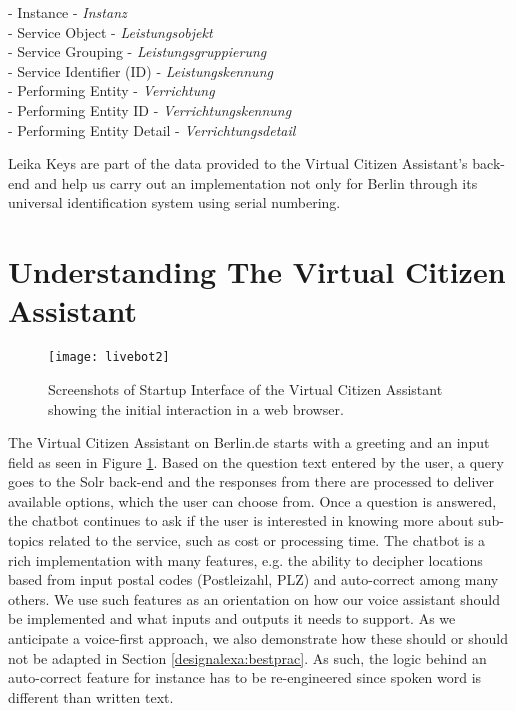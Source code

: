 \begin{flushleft}
- Instance \quad \quad \quad \quad \quad \quad \space \space  - \textit{Instanz}\\
- Service Object \quad \quad \quad  \space \space \space \space - \textit{Leistungsobjekt}\\
- Service Grouping \quad \quad \space \space \space - \textit{Leistungsgruppierung}\\
- Service Identifier (ID)   \space \space \space \space- \textit{Leistungskennung}\\
- Performing Entity \quad \quad \space \space - \textit{Verrichtung}\\
- Performing Entity ID \quad \space - \textit{Verrichtungskennung}\\
- Performing Entity Detail  - \textit{Verrichtungsdetail}\\
\end{flushleft}

Leika Keys are part of the data provided to the Virtual Citizen Assistant's back-end and help us carry out an implementation not only for Berlin through its universal identification system using serial numbering.


\section{Understanding The Virtual Citizen Assistant}




\begin{figure}[H]
	\centering
	\caption[Startup Interface of the Virtual Citizen Assistant]{Screenshots of Startup Interface of the Virtual Citizen Assistant showing the initial interaction in a web browser.}
	\label{vca:start}
	\texttt{[image: livebot2]}
\end{figure}


The Virtual Citizen Assistant on Berlin.de starts with a greeting and an input field as seen in Figure \ref{vca:start}. Based on the question text entered by the user, a query goes to the Solr back-end and the responses from there are processed to deliver available options, which the user can choose from.
Once a question is answered, the chatbot continues to ask if the user is interested in knowing more about sub-topics related to the service, such as cost or processing time.
The chatbot is a rich implementation with many features, e.g. the ability to decipher locations based from input postal codes (Postleizahl, PLZ) and auto-correct among many others. We use such %
features as an orientation on how our voice assistant should be implemented and what inputs and outputs it needs to support. As we anticipate a voice-first approach, we also demonstrate how these should or should not be adapted in Section \ref{designalexa:bestprac}. As such, the logic behind an auto-correct feature for instance has to be re-engineered since spoken word is different than written text.\\

